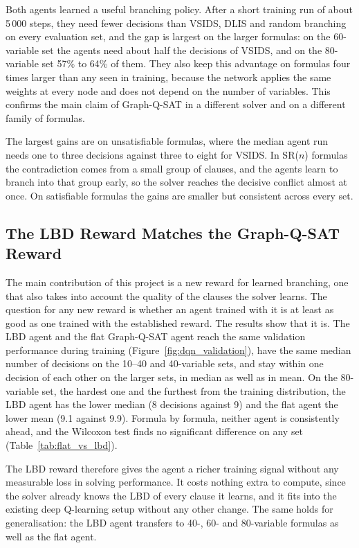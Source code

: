 \documentclass[11pt,a4paper]{article}
\begin{document}
Both agents learned a useful branching policy. After a short training run of about 5\,000 steps, they need fewer decisions than VSIDS, DLIS and random branching on every evaluation set, and the gap is largest on the larger formulas: on the 60-variable set the agents need about half the decisions of VSIDS, and on the 80-variable set 57\% to 64\% of them. They also keep this advantage on formulas four times larger than any seen in training, because the network applies the same weights at every node and does not depend on the number of variables. This confirms the main claim of Graph-Q-SAT in a different solver and on a different family of formulas.

The largest gains are on unsatisfiable formulas, where the median agent run needs one to three decisions against three to eight for VSIDS. In SR($n$) formulas the contradiction comes from a small group of clauses, and the agents learn to branch into that group early, so the solver reaches the decisive conflict almost at once. On satisfiable formulas the gains are smaller but consistent across every set.

\subsection{The LBD Reward Matches the Graph-Q-SAT Reward}

The main contribution of this project is a new reward for learned branching, one that also takes into account the quality of the clauses the solver learns. The question for any new reward is whether an agent trained with it is at least as good as one trained with the established reward. The results show that it is. The LBD agent and the flat Graph-Q-SAT agent reach the same validation performance during training (Figure~\ref{fig:dqn_validation}), have the same median number of decisions on the 10--40 and 40-variable sets, and stay within one decision of each other on the larger sets, in median as well as in mean. On the 80-variable set, the hardest one and the furthest from the training distribution, the LBD agent has the lower median (8 decisions against 9) and the flat agent the lower mean (9.1 against 9.9). Formula by formula, neither agent is consistently ahead, and the Wilcoxon test finds no significant difference on any set (Table~\ref{tab:flat_vs_lbd}).

The LBD reward therefore gives the agent a richer training signal without any measurable loss in solving performance. It costs nothing extra to compute, since the solver already knows the LBD of every clause it learns, and it fits into the existing deep Q-learning setup without any other change. The same holds for generalisation: the LBD agent transfers to 40-, 60- and 80-variable formulas as well as the flat agent.
\end{document}
